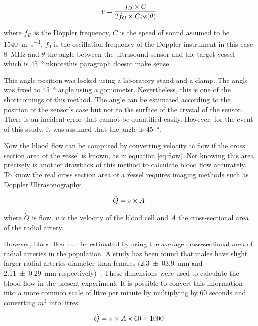 \begin{align}
	\label{eq:doppler}
	v = \frac{f_D \times C}{2 f_O \times Cos(\theta)} \tagaddtext{[\si{\meter\per\second}]}
\end{align}

where $f_D$ is the Doppler frequency, $C$ is the speed of sound assumed to be \SI{1540}{\meter\per\second}, $f_0$ is the oscillation frequency of the Doppler instrument in this case \SI{8}{\mega\hertz} and $\theta$ the angle between the ultrasound sensor and the target vessel which is \SI{45}{\degree}.nknote{this paragraph doesnt make sense}

This angle position was locked using a laboratory stand and a clamp. The angle was fixed to \SI{45}{\degree} angle using a goniometer. Nevertheless, this is one of the shortcomings of this method. The angle can be estimated according to the position of the sensor's case but not to the surface of the crystal of the sensor. There is an incident error that cannot be quantified easily. However, for the event of this study, it was assumed that the angle is \SI{45}{\degree}.

Now the blood flow can be computed by converting velocity to flow if the cross section area of the vessel is known, as in equation \ref{eq:flow}. Not knowing this area precisely is another drawback of this method to calculate blood flow accurately. To know the real cross section area of a vessel requires imaging methods such as Doppler Ultrasonography. 

\begin{align}
	\label{eq:flow}
	\dot{Q} = v \times A \tagaddtext{[\si{\cubic\meter\per\second}]}
\end{align}

where $\dot{Q}$ is flow, $v$ is the velocity of the blood cell and $A$ the cross-sectional area of the radial artery.

However, blood flow can be estimated by using the average cross-sectional area of radial arteries in the population. A study has been found that males have slight larger radial arteries diameter than females (\SI{2.3(039)}{\mm} and \SI{2.11(029)}{\mm} respectively)~\cite{ashraf2010size}. These dimensions were used to calculate the blood flow in the present experiment. It is possible to convert this information into a more common scale of litre per minute by multiplying by 60 seconds and converting $m^3$ into litres. 

\begin{align}
\label{eq:flow_l/min}
\dot{Q} = v \times A \times 60 \times 1000 \tagaddtext{[\si{\cubic\meter\per\second}]}
\end{align}

